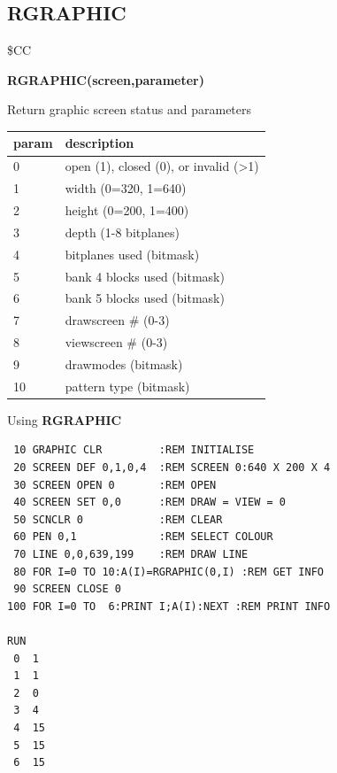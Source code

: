 \subsection{RGRAPHIC}
\begin{description}[leftmargin=2cm,style=nextline]
\item [Token:] \$CC
\item [Format:] {\bf RGRAPHIC(screen,parameter)}
\item [Usage:]  Return graphic screen status and parameters

\ttfamily
{\setlength{\tabcolsep}{1mm}
\begin{tabular}{|l|l|}
\hline
 param  & description \\
\hline
 0 & open (1), closed (0), or invalid (>1)  \\
 1 & width  (0=320, 1=640)  \\
 2 & height (0=200, 1=400)  \\
 3 & depth (1-8 bitplanes)  \\
 4 & bitplanes used  (bitmask)  \\
 5 & bank 4 blocks used (bitmask)  \\
 6 & bank 5 blocks used (bitmask)  \\
 7 & drawscreen \# (0-3)  \\
 8 & viewscreen \# (0-3)  \\
 9 & drawmodes  (bitmask)  \\
10 & pattern type  (bitmask)  \\
\hline
\end{tabular}
}

\item [Example:] Using {\bf RGRAPHIC}

\begin{tcolorbox}[colback=black,coltext=white]
\verbatimfont{\codefont}
\begin{verbatim}
 10 GRAPHIC CLR         :REM INITIALISE
 20 SCREEN DEF 0,1,0,4  :REM SCREEN 0:640 X 200 X 4
 30 SCREEN OPEN 0       :REM OPEN
 40 SCREEN SET 0,0      :REM DRAW = VIEW = 0
 50 SCNCLR 0            :REM CLEAR
 60 PEN 0,1             :REM SELECT COLOUR
 70 LINE 0,0,639,199    :REM DRAW LINE
 80 FOR I=0 TO 10:A(I)=RGRAPHIC(0,I) :REM GET INFO
 90 SCREEN CLOSE 0
100 FOR I=0 TO  6:PRINT I;A(I):NEXT :REM PRINT INFO

RUN
 0  1
 1  1
 2  0
 3  4
 4  15
 5  15
 6  15
\end{verbatim}
\end{tcolorbox}
\end{description}



